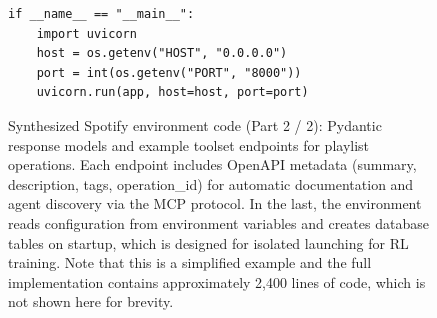 \begin{figure}[t]
\begin{minipage}{0.97\textwidth}
\begin{lstlisting}[style=pythonstyle, firstnumber=200]
if __name__ == "__main__":
    import uvicorn
    host = os.getenv("HOST", "0.0.0.0")
    port = int(os.getenv("PORT", "8000"))
    uvicorn.run(app, host=host, port=port)
\end{lstlisting}
\end{minipage}
\caption{Synthesized Spotify environment code (Part 2 / 2): Pydantic response models and example toolset endpoints for playlist operations. Each endpoint includes OpenAPI metadata (summary, description, tags, operation\_id) for automatic documentation and agent discovery via the MCP protocol. In the last, the environment reads configuration from environment variables and creates database tables on startup, which is designed for isolated launching for RL training. Note that this is a simplified example and the full implementation contains approximately 2,400 lines of code, which is not shown here for brevity.}
\label{fig:env-code-part2}
\end{figure}

